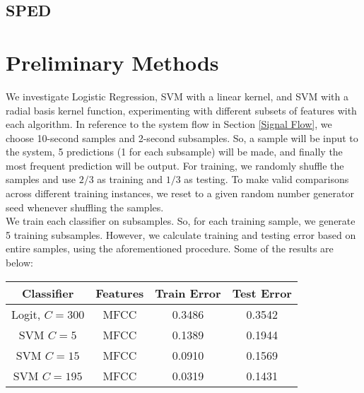 \documentclass[journal]{IEEEtran}
\begin{document}
\subsection{SPED}

\section{Preliminary Methods}
We investigate Logistic Regression, SVM with a linear kernel, and SVM with a radial basis kernel function, experimenting with different subsets of features with each algorithm. In reference to the system flow in Section \ref{Signal Flow}, we choose 10-second samples and 2-second subsamples. So, a sample will be input to the system, 5 predictions (1 for each subsample) will be made, and finally the most frequent prediction will be output.  For training, we randomly shuffle the samples and use $2/3$ as training and $1/3$ as testing. To make valid comparisons across different training instances, we reset to a given random number generator seed whenever shuffling the samples.\\

We train each classifier on subsamples. So, for each training sample, we generate 5 training subsamples. However, we calculate training and testing error based on entire samples, using the aforementioned procedure. Some of the results are below:
\begin{table}[H]
\centering
\begin{tabular}{|c|c|c|c|}
\hline
\textbf{Classifier} & Features & Train Error & Test Error\\
\hline
Logit, $C=300$ & MFCC& 0.3486 & 0.3542\\
\hline
SVM $C = 5$ & MFCC & 0.1389 & 0.1944\\
\hline
SVM $C = 15$ & MFCC & 0.0910 & 0.1569\\
\hline
SVM $C = 195$ & MFCC & 0.0319 & 0.1431\\
\hline
\end{tabular}
\end{table}


%
%
%


\raggedbottom
\end{document}

